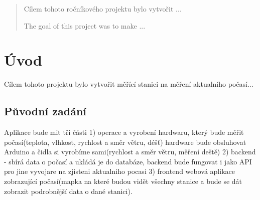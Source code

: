 \begin{abstract}
    Cílem tohoto ročníkového projektu bylo vytvořit ...
    
    \hspace{}
    
    \hspace{}
    
    The goal of this project was to make ...
    
\end{abstract}

\section{Úvod}
Cílem tohoto projektu bylo vytvořit měřící stanici na měření aktualního počasí...

\subsection{Původní zadání}
Aplikace bude mit tři části 1) operace a vyrobení hardwaru, který bude měřit počasí(teplota, vlhkost, rychlost a směr větru, déšť) hardware bude obsluhovat Arduino a čidla si vyrobíme sami(rychlost a směr větru, měření deště) 2) backend - sbírá data o počasí a ukládá je do databáze, backend bude fungovat i jako API pro jine vyvojare na zjisteni aktualniho pocasi 3) frontend webová aplikace zobrazující počasí(mapka na které budou vidět všechny stanice a bude se dát zobrazit podrobnější data o dané stanici).
